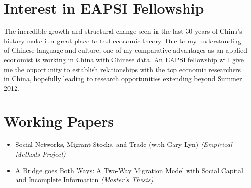 \documentclass[a4paper,10pt]{article}
\begin{document}
\section*{Interest in EAPSI Fellowship}
The incredible growth and structural change seen in the last 30 years of China's history make it a great place to test economic theory.  Due to my understanding of Chinese language and culture, one of my comparative advantages as an applied economist is working in China with Chinese data.  An EAPSI fellowship will give me the opportunity to establish relationships with the top economic researchers in China, hopefully leading to research opportunities extending beyond Summer 2012.     

\section*{Working Papers}
\begin{itemize}
 \item Social Networks, Migrant Stocks, and Trade (with Gary Lyn) \emph{(Empirical Methods Project)}
 \item A Bridge goes Both Ways: A Two-Way Migration Model with Social Capital and Incomplete Information \emph{(Master's Thesis)}
\end{itemize}
\end{document}
